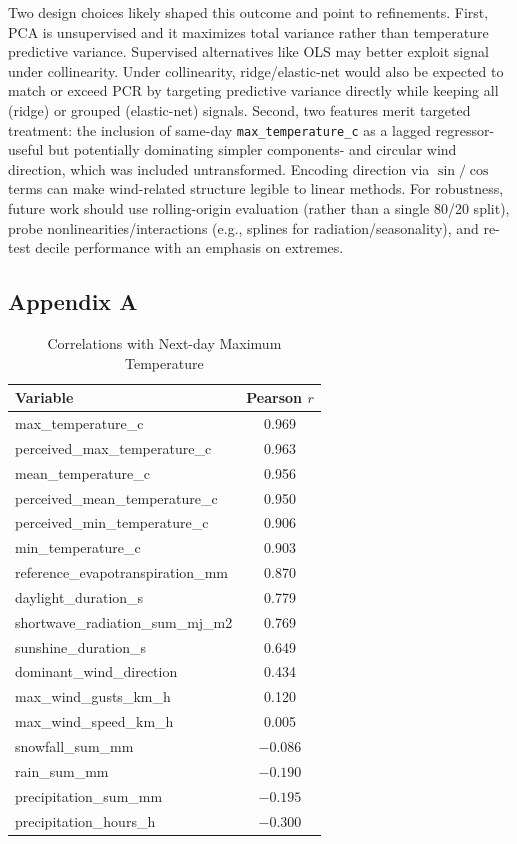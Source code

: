 \documentclass[
]{article}
\begin{document}
Two design choices likely shaped this outcome and point to refinements.
First, PCA is unsupervised and it maximizes total variance rather than
temperature predictive variance. Supervised alternatives like OLS may
better exploit signal under collinearity. Under collinearity,
ridge/elastic-net would also be expected to match or exceed PCR by
targeting predictive variance directly while keeping all (ridge) or
grouped (elastic-net) signals. Second, two features merit targeted
treatment: the inclusion of same-day \texttt{max\_temperature\_c} as a
lagged regressor- useful but potentially dominating simpler components-
and circular wind direction, which was included untransformed. Encoding
direction via \(\sin/\cos\) terms can make wind-related structure
legible to linear methods. For robustness, future work should use
rolling-origin evaluation (rather than a single 80/20 split), probe
nonlinearities/interactions (e.g., splines for radiation/seasonality),
and re-test decile performance with an emphasis on extremes.

\subsection{Appendix A}\label{appendix-a}

\begin{table}[H]\centering
\caption{Correlations with Next-day Maximum Temperature}
\label{tab:A1}
\begin{tabular}{lc}
\toprule
Variable & Pearson $r$ \\
\midrule
max\_temperature\_c & 0.969 \\
perceived\_max\_temperature\_c & 0.963 \\
mean\_temperature\_c & 0.956 \\
perceived\_mean\_temperature\_c & 0.950 \\
perceived\_min\_temperature\_c & 0.906 \\
min\_temperature\_c & 0.903 \\
reference\_evapotranspiration\_mm & 0.870 \\
daylight\_duration\_s & 0.779 \\
shortwave\_radiation\_sum\_mj\_m2 & 0.769 \\
sunshine\_duration\_s & 0.649 \\
dominant\_wind\_direction & 0.434 \\
max\_wind\_gusts\_km\_h & 0.120 \\
max\_wind\_speed\_km\_h & 0.005 \\
snowfall\_sum\_mm & $-0.086$ \\
rain\_sum\_mm & $-0.190$ \\
precipitation\_sum\_mm & $-0.195$ \\
precipitation\_hours\_h & $-0.300$ \\
\bottomrule
\end{tabular}
\end{table}
\end{document}
